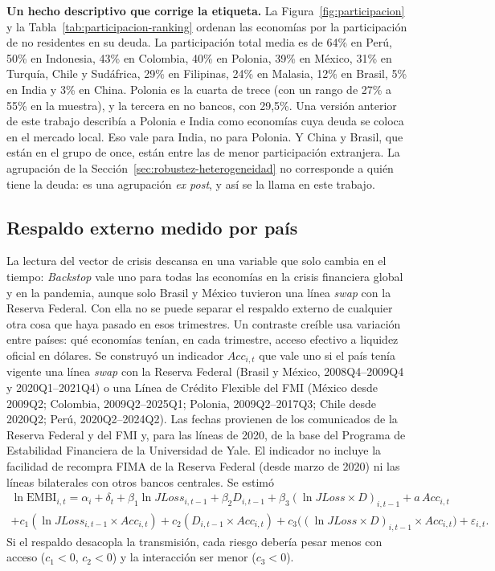 \textbf{Un hecho descriptivo que corrige la etiqueta.} La Figura~\ref{fig:participacion} y la Tabla~\ref{tab:participacion-ranking} ordenan las economías por la participación de no residentes en su deuda. La participación total media es de 64\% en Perú, 50\% en Indonesia, 43\% en Colombia, 40\% en Polonia, 39\% en México, 31\% en Turquía, Chile y Sudáfrica, 29\% en Filipinas, 24\% en Malasia, 12\% en Brasil, 5\% en India y 3\% en China. Polonia es la cuarta de trece (con un rango de 27\% a 55\% en la muestra), y la tercera en no bancos, con 29,5\%. Una versión anterior de este trabajo describía a Polonia e India como economías cuya deuda se coloca en el mercado local. Eso vale para India, no para Polonia. Y China y Brasil, que están en el grupo de once, están entre las de menor participación extranjera. La agrupación de la Sección~\ref{sec:robustez-heterogeneidad} no corresponde a quién tiene la deuda: es una agrupación \textit{ex post}, y así se la llama en este trabajo.

\subsection{Respaldo externo medido por país}
\label{sec:respaldo-pais}

La lectura del vector de crisis descansa en una variable que solo cambia en el tiempo: \textit{Backstop} vale uno para todas las economías en la crisis financiera global y en la pandemia, aunque solo Brasil y México tuvieron una línea \textit{swap} con la Reserva Federal. Con ella no se puede separar el respaldo externo de cualquier otra cosa que haya pasado en esos trimestres. Un contraste creíble usa variación entre países: qué economías tenían, en cada trimestre, acceso efectivo a liquidez oficial en dólares. Se construyó un indicador $Acc_{i,t}$ que vale uno si el país tenía vigente una línea \textit{swap} con la Reserva Federal (Brasil y México, 2008Q4--2009Q4 y 2020Q1--2021Q4) o una Línea de Crédito Flexible del FMI (México desde 2009Q2; Colombia, 2009Q2--2025Q1; Polonia, 2009Q2--2017Q3; Chile desde 2020Q2; Perú, 2020Q2--2024Q2). Las fechas provienen de los comunicados de la Reserva Federal y del FMI y, para las líneas de 2020, de la base del Programa de Estabilidad Financiera de la Universidad de Yale. El indicador no incluye la facilidad de recompra FIMA de la Reserva Federal (desde marzo de 2020) ni las líneas bilaterales con otros bancos centrales. Se estimó
\begin{multline}
\ln\mathrm{EMBI}_{i,t}=\alpha_i+\delta_t+\beta_1\ln JLoss_{i,t-1}+\beta_2D_{i,t-1}+\beta_3(\ln JLoss\times D)_{i,t-1}+a\,Acc_{i,t}\\
+c_1(\ln JLoss_{i,t-1}\times Acc_{i,t})+c_2(D_{i,t-1}\times Acc_{i,t})+c_3\big((\ln JLoss\times D)_{i,t-1}\times Acc_{i,t}\big)+\varepsilon_{i,t}.
\label{eq:respaldo}
\end{multline}
Si el respaldo desacopla la transmisión, cada riesgo debería pesar menos con acceso ($c_1<0$, $c_2<0$) y la interacción ser menor ($c_3<0$).

